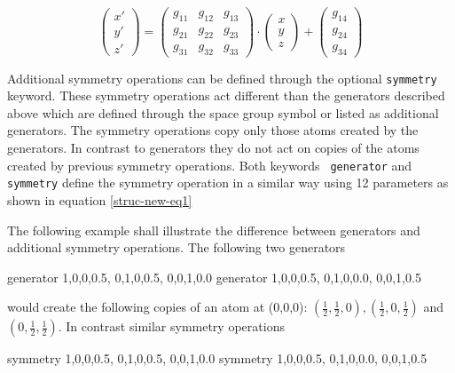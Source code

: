\begin{equation}
        \left ( \begin{array}{c} x'\\ y'\\ z'\end{array} \right ) =
        \left (
        \begin{array}{ccc}
                g_{11} & g_{12} & g_{13}  \\
                g_{21} & g_{22} & g_{23}  \\
                g_{31} & g_{32} & g_{33}
        \end{array}
        \right ) \cdot
        \left ( \begin{array}{c} x\\ y\\ z\end{array} \right ) +
        \left ( \begin{array}{c} g_{14}\\ g_{24}\\ g_{34}\end{array} \right )
        \label{struc-new-eq1}
\end{equation}

Additional symmetry operations can be defined through the optional
{\tt symmetry} keyword.  These symmetry operations act different
than the generators described above which are defined through the
space group symbol or listed as additional generators.  The symmetry
operations copy only those atoms created by the generators.  In
contrast to generators they do not act on copies of the atoms
created by previous symmetry operations. Both keywords {\tt
generator} and {\tt symmetry} define the symmetry operation in a
similar way using 12 parameters as shown in equation
\ref{struc-new-eq1}
\par

The following example shall illustrate the difference between
generators and additional symmetry operations.  The following two
generators

\begin{MacVerbatim}
    generator 1,0,0,0.5, 0,1,0,0.5, 0,0,1,0.0
    generator 1,0,0,0.5, 0,1,0,0.0, 0,0,1,0.5
\end{MacVerbatim}

would create the following copies of an atom at (0,0,0):
$(\frac{1}{2}, \frac{1}{2}, 0), (\frac{1}{2}, 0, \frac{1}{2})$ and
$(0, \frac{1}{2}, \frac{1}{2})$.  In contrast similar symmetry
operations

\begin{MacVerbatim}
    symmetry 1,0,0,0.5, 0,1,0,0.5, 0,0,1,0.0
    symmetry 1,0,0,0.5, 0,1,0,0.0, 0,0,1,0.5
\end{MacVerbatim}

